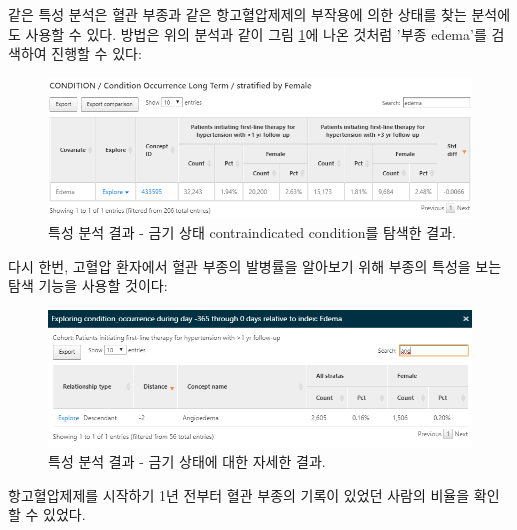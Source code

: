 \documentclass[10.5pt]{book}
\theoremstyle{definition}
\theoremstyle{definition}
\theoremstyle{definition}
\theoremstyle{remark}
\begin{document}
같은 특성 분석은 혈관 부종과 같은 항고혈압제제의 부작용에 의한 상태를
찾는 분석에도 사용할 수 있다. 방법은 위의 분석과 같이 그림
\ref{fig:atlasCharacterizationResultsContra}에 나온 것처럼 '부종
edema'를 검색하여 진행할 수 있다:

\begin{figure}

{\centering \includegraphics[width=1\linewidth]{images/Characterization/atlasCharacterizationResultsContra} 

}

\caption{특성 분석 결과 - 금기 상태 contraindicated condition를 탐색한 결과.}\label{fig:atlasCharacterizationResultsContra}
\end{figure}

다시 한번, 고혈압 환자에서 혈관 부종의 발병률을 알아보기 위해 부종의
특성을 보는 탐색 기능을 사용할 것이다:

\begin{figure}

{\centering \includegraphics[width=1\linewidth]{images/Characterization/atlasCharacterizationResultsContraExplore} 

}

\caption{특성 분석 결과 - 금기 상태에 대한 자세한 결과.}\label{fig:atlasCharacterizationResultsContraExplore}
\end{figure}

항고혈압제제를 시작하기 1년 전부터 혈관 부종의 기록이 있었던 사람의
비율을 확인할 수 있었다.
\end{document}
